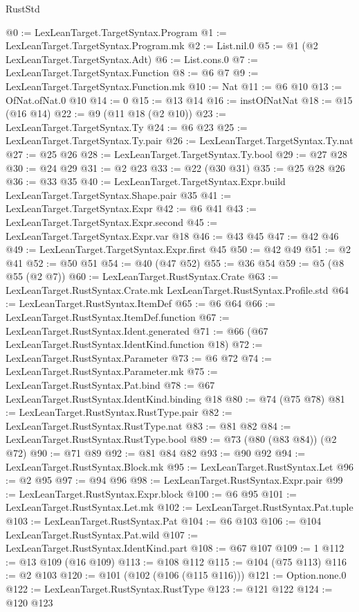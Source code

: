 \begin{lexlean}{RustStd}
\begin{coremodule}
{\begin{coremodule}
{{{{{@0 := LexLeanTarget.TargetSyntax.Program
@1 := LexLeanTarget.TargetSyntax.Program.mk
@2 := List.nil.{0}
@5 := @1 (@2 LexLeanTarget.TargetSyntax.Adt)
@6 := List.cons.{0}
@7 := LexLeanTarget.TargetSyntax.Function
@8 := @6 @7
@9 := LexLeanTarget.TargetSyntax.Function.mk
@10 := Nat
@11 := @6 @10
@13 := OfNat.ofNat.{0} @10
@14 := 0
@15 := @13 @14
@16 := instOfNatNat
@18 := @15 (@16 @14)
@22 := @9 (@11 @18 (@2 @10))
@23 := LexLeanTarget.TargetSyntax.Ty
@24 := @6 @23
@25 := LexLeanTarget.TargetSyntax.Ty.pair
@26 := LexLeanTarget.TargetSyntax.Ty.nat
@27 := @25 @26
@28 := LexLeanTarget.TargetSyntax.Ty.bool
@29 := @27 @28
@30 := @24 @29
@31 := @2 @23
@33 := @22 (@30 @31)
@35 := @25 @28 @26
@36 := @33 @35
@40 := LexLeanTarget.TargetSyntax.Expr.build LexLeanTarget.TargetSyntax.Shape.pair @35
@41 := LexLeanTarget.TargetSyntax.Expr
@42 := @6 @41
@43 := LexLeanTarget.TargetSyntax.Expr.second
@45 := LexLeanTarget.TargetSyntax.Expr.var @18
@46 := @43 @45
@47 := @42 @46
@49 := LexLeanTarget.TargetSyntax.Expr.first @45
@50 := @42 @49
@51 := @2 @41
@52 := @50 @51
@54 := @40 (@47 @52)
@55 := @36 @54
@59 := @5 (@8 @55 (@2 @7))
@60 := LexLeanTarget.RustSyntax.Crate
@63 := LexLeanTarget.RustSyntax.Crate.mk LexLeanTarget.RustSyntax.Profile.std
@64 := LexLeanTarget.RustSyntax.ItemDef
@65 := @6 @64
@66 := LexLeanTarget.RustSyntax.ItemDef.function
@67 := LexLeanTarget.RustSyntax.Ident.generated
@71 := @66 (@67 LexLeanTarget.RustSyntax.IdentKind.function @18)
@72 := LexLeanTarget.RustSyntax.Parameter
@73 := @6 @72
@74 := LexLeanTarget.RustSyntax.Parameter.mk
@75 := LexLeanTarget.RustSyntax.Pat.bind
@78 := @67 LexLeanTarget.RustSyntax.IdentKind.binding @18
@80 := @74 (@75 @78)
@81 := LexLeanTarget.RustSyntax.RustType.pair
@82 := LexLeanTarget.RustSyntax.RustType.nat
@83 := @81 @82
@84 := LexLeanTarget.RustSyntax.RustType.bool
@89 := @73 (@80 (@83 @84)) (@2 @72)
@90 := @71 @89
@92 := @81 @84 @82
@93 := @90 @92
@94 := LexLeanTarget.RustSyntax.Block.mk
@95 := LexLeanTarget.RustSyntax.Let
@96 := @2 @95
@97 := @94 @96
@98 := LexLeanTarget.RustSyntax.Expr.pair
@99 := LexLeanTarget.RustSyntax.Expr.block
@100 := @6 @95
@101 := LexLeanTarget.RustSyntax.Let.mk
@102 := LexLeanTarget.RustSyntax.Pat.tuple
@103 := LexLeanTarget.RustSyntax.Pat
@104 := @6 @103
@106 := @104 LexLeanTarget.RustSyntax.Pat.wild
@107 := LexLeanTarget.RustSyntax.IdentKind.part
@108 := @67 @107
@109 := 1
@112 := @13 @109 (@16 @109)
@113 := @108 @112
@115 := @104 (@75 @113)
@116 := @2 @103
@120 := @101 (@102 (@106 (@115 @116)))
@121 := Option.none.{0}
@122 := LexLeanTarget.RustSyntax.RustType
@123 := @121 @122
@124 := @120 @123
}}}}}
\end{coremodule}}
\end{coremodule}
\end{lexlean}
